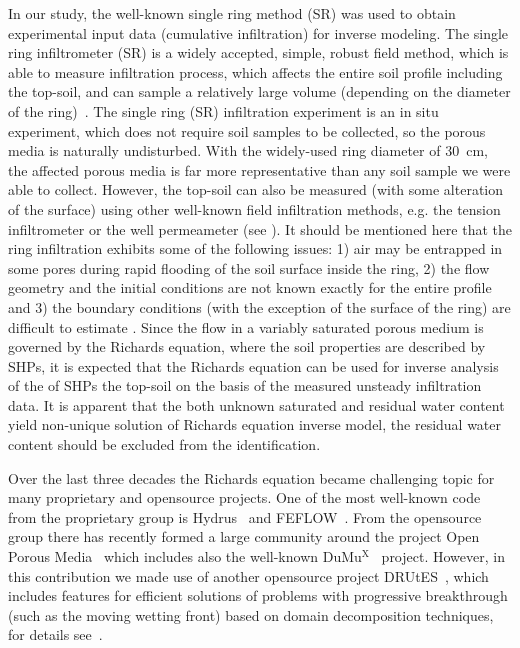 \documentclass[review]{myarticle}
\begin{document}
In our study, the well-known single ring method (SR) was used to obtain experimental input data (cumulative infiltration) for inverse modeling. The  single ring infiltrometer (SR) is a widely accepted, simple, robust field method, which is able to measure infiltration process, which affects the entire soil profile including the top-soil,  and can sample a relatively large volume (depending on the diameter of the ring)~\citep{Cheng,ReynoldsWD}.  The single ring (SR) infiltration experiment is an in situ experiment, which does not require soil samples to be collected, so the porous media is naturally undisturbed. With the widely-used ring diameter of 30~cm, the affected porous media is far more representative than any soil sample  we were able to collect. However, the top-soil can also be measured (with some alteration of the surface) using other well-known field infiltration methods, e.g. the tension infiltrometer or the well permeameter (see \citep{AnguloJaramillo,ReynoldsWDGP}). 
 It should be mentioned here that the ring  infiltration exhibits some of the following issues: 1) air may be entrapped in some pores during rapid flooding of the soil surface inside the ring, 2) the flow geometry and the  initial conditions are not known exactly for the entire profile and 3) the boundary conditions (with the exception of the surface of the ring) are difficult to estimate  \citep{Jacka1,Fodor}.
Since the flow in a variably saturated porous medium is governed by the Richards equation, where the soil properties are described by SHPs, it is expected that the Richards equation can be used for inverse analysis of the of SHPs the top-soil on the basis of the measured unsteady infiltration data. It is apparent that the both unknown saturated and residual water content yield non-unique solution of Richards equation inverse model, the residual water content should be excluded from the identification.

Over the last three decades the Richards equation became challenging topic for many proprietary and opensource projects. 
 One of the most well-known code from the proprietary group is Hydrus~\citep{SimunekJ} and FEFLOW~\citep{feflow}. From the opensource group there has recently formed a large community around the project Open Porous Media~\citep{opm} which includes also the well-known DuMu$^{\textrm{X}}$~\citep{dumux} project. However, in this contribution we made use of another opensource project DRUtES~\citep{drutes}, which includes features for efficient solutions of problems with progressive breakthrough (such as the moving wetting front) based on domain decomposition techniques, for details see~\citep{mojecomp, mojejcam2, mojeamc2}.
\end{document}
